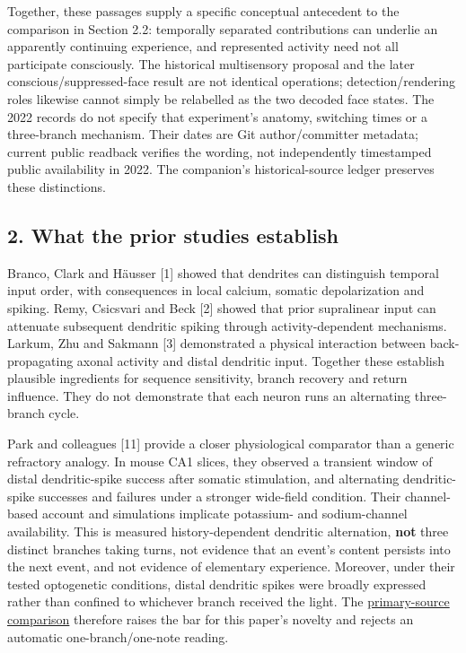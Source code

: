 \documentclass[
  american,
  11pt,
  letterpaper,
]{article}
\begin{document}
Together, these passages supply a specific conceptual antecedent to the comparison in Section 2.2: temporally separated contributions can underlie an apparently continuing experience, and represented activity need not all participate consciously. The historical multisensory proposal and the later conscious/suppressed-face result are not identical operations; detection/rendering roles likewise cannot simply be relabelled as the two decoded face states. The 2022 records do not specify that experiment's anatomy, switching times or a three-branch mechanism. Their dates are Git author/committer metadata; current public readback verifies the wording, not independently timestamped public availability in 2022. The companion's historical-source ledger preserves these distinctions.

\subsection{2. What the prior studies establish}\label{what-the-prior-studies-establish}

Branco, Clark and Häusser {[}1{]} showed that dendrites can distinguish temporal input order, with consequences in local calcium, somatic depolarization and spiking. Remy, Csicsvari and Beck {[}2{]} showed that prior supralinear input can attenuate subsequent dendritic spiking through activity-dependent mechanisms. Larkum, Zhu and Sakmann {[}3{]} demonstrated a physical interaction between back-propagating axonal activity and distal dendritic input. Together these establish plausible ingredients for sequence sensitivity, branch recovery and return influence. They do not demonstrate that each neuron runs an alternating three-branch cycle.

Park and colleagues {[}11{]} provide a closer physiological comparator than a generic refractory analogy. In mouse CA1 slices, they observed a transient window of distal dendritic-spike success after somatic stimulation, and alternating dendritic-spike successes and failures under a stronger wide-field condition. Their channel-based account and simulations implicate potassium- and sodium-channel availability. This is measured history-dependent dendritic alternation, \textbf{not} three distinct branches taking turns, not evidence that an event's content persists into the next event, and not evidence of elementary experience. Moreover, under their tested optogenetic conditions, distal dendritic spikes were broadly expressed rather than confined to whichever branch received the light. The \href{https://github.com/v5ma/v5ma.github.io/blob/f6d3867df89ae9dea32f763b1d55c84212c41cc6/papers/companions/five-papers-20260923/temporal/paper/reviews/PARK-2025-DENDRITIC-ALTERNATION-PRIMARY-COMPARISON-20260922.md}{primary-source comparison} therefore raises the bar for this paper's novelty and rejects an automatic one-branch/one-note reading.
\end{document}
